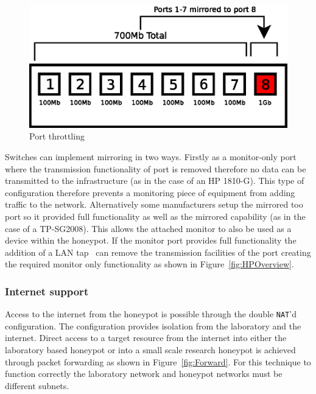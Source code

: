 \begin{figure}[h]
\begin{center}
	\includegraphics[scale=0.4]{Images/Throttle.eps}
\caption{Port throttling}
\label{fig:throttling}
\end{center}
\end{figure}

Switches can implement mirroring in two ways. Firstly as a monitor-only port
where the transmission functionality of port is removed therefore no data can
be transmitted to the infrastructure (as in the case of an HP 1810-G). This
type of configuration therefore prevents a monitoring piece of equipment from
adding traffic to the network. Alternatively some manufacturers setup the
mirrored too port so it provided full functionality as well as the mirrored
capability (as in the case of a TP-SG2008). This allows the attached monitor to
also be used as a device within the honeypot. If the monitor port provides full
functionality the addition of a LAN tap~\cite{RB:13} can remove the
transmission facilities of the port creating the required monitor only
functionality as shown in Figure~\ref{fig:HPOverview}.

\subsubsection{Internet support}

Access to the internet from the honeypot is possible through the double
\texttt{NAT}'d configuration. The configuration provides isolation from the
laboratory and the internet. Direct access to a target resource from the
internet into either the laboratory based honeypot or into a small scale
research honeypot is achieved through packet forwarding as shown in
Figure~\ref{fig:Forward}. For this technique to function correctly the
laboratory network and honeypot networks must be different subnets.

